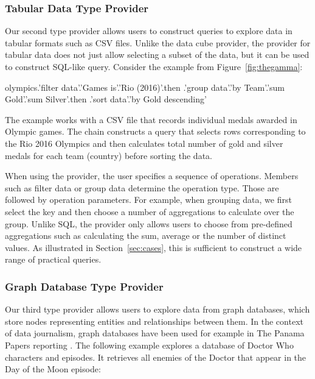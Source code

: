 \documentclass[manuscript,review,anonymous]{acmart}
\newcommand{\ikvd}[1]{{\fontfamily{zi4}\selectfont\small #1}}
\begin{document}
\subsubsection*{Tabular Data Type Provider}

Our second type provider allows users to construct queries to explore data in tabular formats
such as CSV files. Unlike the data cube provider, the provider for tabular data does not just
allow selecting a subset of the data, but it can be used to construct SQL-like query. Consider
the example from Figure~\ref{fig:thegamma}:

\begin{thegamma}
olympics.'filter data'.'Games is'.'Rio (2016)'.then
  .'group data'.'by Team'.'sum Gold'.'sum Silver'.then
  .'sort data'.'by Gold descending'
\end{thegamma}

\noindent
The example works with a CSV file that records individual medals awarded in Olympic games.
The chain constructs a query that selects rows corresponding to the Rio 2016 Olympics and then
calculates total number of gold and silver medals for each team (country) before sorting the data.

When using the provider, the user specifies a sequence of operations. Members such as
\ikvd{\textquotesingle filter data\textquotesingle} or \ikvd{\textquotesingle group data\textquotesingle}
determine the operation type. Those are followed by operation parameters. For example, when grouping
data, we first select the key and then choose a number of aggregations to calculate over the group.
Unlike SQL, the provider only allows users to choose from pre-defined aggregations such as
calculating the sum, average or the number of distinct values. As illustrated in
Section~\ref{sec:cases}, this is sufficient to construct a wide range of practical queries.



\subsubsection*{Graph Database Type Provider}
Our third type provider allows users to explore data from graph databases, which store
nodes representing entities and relationships between them. In the context of data journalism,
graph databases have been used for example in The Panama Papers reporting \cite{panama}.
The following example explores a database of Doctor Who characters and episodes. It retrieves
all enemies of the Doctor that appear in the Day of the Moon episode:
\end{document}
